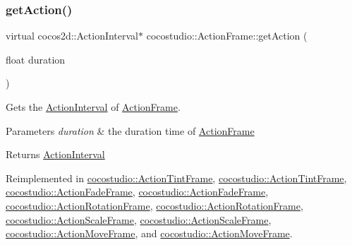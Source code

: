 \mbox{\label{classcocostudio_1_1ActionFrame_a9b4544cd2155cbd46a61dd866daab18b}} 
\subsubsection{\texorpdfstring{get\+Action()}{getAction()}\hspace{0.1cm}{\footnotesize\ttfamily [2/4]}}
{\footnotesize\ttfamily virtual cocos2d\+::\+Action\+Interval$\ast$ cocostudio\+::\+Action\+Frame\+::get\+Action (\begin{DoxyParamCaption}\item[{float}]{duration }\end{DoxyParamCaption})\hspace{0.3cm}{\ttfamily [virtual]}}

Gets the \hyperlink{classActionInterval}{Action\+Interval} of \hyperlink{classcocostudio_1_1ActionFrame}{Action\+Frame}.


\begin{DoxyParams}{Parameters}
{\em duration} & the duration time of \hyperlink{classcocostudio_1_1ActionFrame}{Action\+Frame}\\
\hline
\end{DoxyParams}
\begin{DoxyReturn}{Returns}
\hyperlink{classActionInterval}{Action\+Interval} 
\end{DoxyReturn}


Reimplemented in \hyperlink{classcocostudio_1_1ActionTintFrame_a819d36221cd38cabd0a7936871578752}{cocostudio\+::\+Action\+Tint\+Frame}, \hyperlink{classcocostudio_1_1ActionTintFrame_ad1329f3513d3c40369182872a08d543e}{cocostudio\+::\+Action\+Tint\+Frame}, \hyperlink{classcocostudio_1_1ActionFadeFrame_a8c4fd77023be47a8879597c06b89e2a1}{cocostudio\+::\+Action\+Fade\+Frame}, \hyperlink{classcocostudio_1_1ActionFadeFrame_a666690711af56eb3dbe6e39c43655f08}{cocostudio\+::\+Action\+Fade\+Frame}, \hyperlink{classcocostudio_1_1ActionRotationFrame_a6ca8b34044106cf7e71dc9fe301d5b5a}{cocostudio\+::\+Action\+Rotation\+Frame}, \hyperlink{classcocostudio_1_1ActionRotationFrame_af44596d9558e7b904a77b1ca504e74b5}{cocostudio\+::\+Action\+Rotation\+Frame}, \hyperlink{classcocostudio_1_1ActionScaleFrame_a7952170933c3dde44525f8917d2e661a}{cocostudio\+::\+Action\+Scale\+Frame}, \hyperlink{classcocostudio_1_1ActionScaleFrame_a7835af6973dddcd7714efd7c45c9bc80}{cocostudio\+::\+Action\+Scale\+Frame}, \hyperlink{classcocostudio_1_1ActionMoveFrame_acdacf22506bf13d5214f70d25b7cfed8}{cocostudio\+::\+Action\+Move\+Frame}, and \hyperlink{classcocostudio_1_1ActionMoveFrame_a57f58bf872a13797b7b121c0bb40793e}{cocostudio\+::\+Action\+Move\+Frame}.

